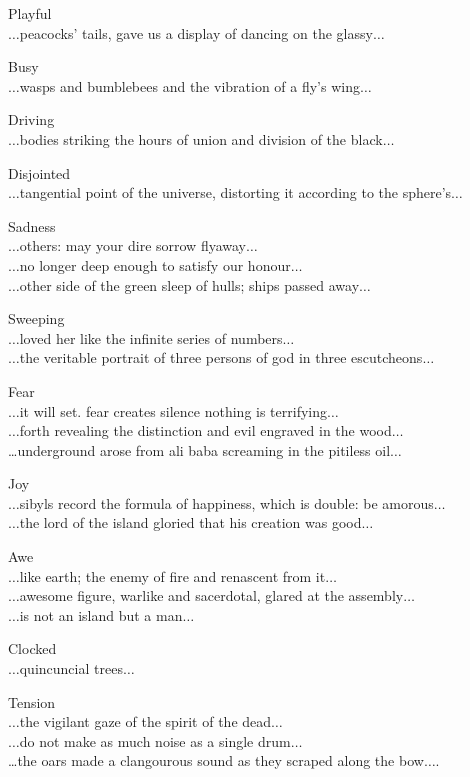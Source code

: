 Playful\\
$\ldots$peacocks' tails, gave us a display of dancing on the glassy$\ldots$

Busy\\
$\ldots$wasps and bumblebees and the vibration of a fly's wing$\ldots$

Driving\\
$\ldots$bodies striking the hours of union and division of the black$\ldots$

Disjointed\\
$\ldots$tangential point of the universe, distorting it according to the sphere's$\ldots$

Sadness\\
$\ldots$others: may your dire sorrow flyaway$\ldots$\\
$\ldots$no longer deep enough to satisfy our honour$\ldots$\\
$\ldots$other side of the green sleep of hulls; ships passed away$\ldots$

Sweeping\\
$\ldots$loved her like the infinite series of numbers$\ldots$\\
$\ldots$the veritable portrait of three persons of god in three escutcheons$\ldots$

Fear\\
$\ldots$it will set. fear creates silence nothing is terrifying$\ldots$\\
$\ldots$forth revealing the distinction and evil engraved in the wood$\ldots$\\
…underground arose from ali baba screaming in the pitiless oil$\ldots$

Joy\\
$\ldots$sibyls record the formula of happiness, which is double: be amorous$\ldots$\\
$\ldots$the lord of the island gloried that his creation was good$\ldots$

Awe\\
$\ldots$like earth; the enemy of fire and renascent from it$\ldots$\\
$\ldots$awesome figure, warlike and sacerdotal, glared at the assembly$\ldots$\\
$\ldots$is not an island but a man$\ldots$

Clocked\\
$\ldots$quincuncial trees$\ldots$

Tension\\
$\ldots$the vigilant gaze of the spirit of the dead$\ldots$\\
$\ldots$do not make as much noise as a single drum$\ldots$\\
…the oars made a clangourous sound as they scraped along the bow$\ldots$.

